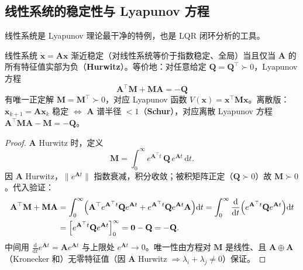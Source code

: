 \subsection{线性系统的稳定性与 Lyapunov 方程}
\label{sec:ctrl-lyap-linear}

线性系统是 Lyapunov 理论最干净的特例，也是 LQR 闭环分析的工具。

\begin{theorem}
\label{thm:ctrl-lyap-eq}
线性系统 $\dot{\mathbf{x}}=\mathbf{A}\mathbf{x}$ 渐近稳定（对线性系统等价于指数稳定、全局）当且仅当 $\mathbf{A}$ 的所有特征值实部为负（\textbf{Hurwitz}）。等价地：对任意给定 $\mathbf{Q}=\mathbf{Q}^\top\succ0$，Lyapunov 方程
\begin{equation}
  \boxed{\mathbf{A}^\top\mathbf{M}+\mathbf{M}\mathbf{A}=-\mathbf{Q}}
  \label{eq:ctrl-lyap-eq}
\end{equation}
有唯一正定解 $\mathbf{M}=\mathbf{M}^\top\succ0$，对应 Lyapunov 函数 $V(\mathbf{x})=\mathbf{x}^\top\mathbf{M}\mathbf{x}$。离散版：$\mathbf{x}_{k+1}=\mathbf{A}\mathbf{x}_k$ 稳定 $\iff$ $\mathbf{A}$ 谱半径 $<1$（\textbf{Schur}），对应离散 Lyapunov 方程 $\mathbf{A}^\top\mathbf{M}\mathbf{A}-\mathbf{M}=-\mathbf{Q}$。
\end{theorem}
\begin{proof}
$\mathbf{A}$ Hurwitz 时，定义
\begin{equation}
  \mathbf{M}=\int_0^\infty e^{\mathbf{A}^\top t}\,\mathbf{Q}\,e^{\mathbf{A}t}\,\mathrm dt.
  \label{eq:ctrl-lyap-int}
\end{equation}
因 $\mathbf{A}$ Hurwitz，$\|e^{\mathbf{A}t}\|$ 指数衰减，积分收敛；被积矩阵正定（$\mathbf{Q}\succ0$）故 $\mathbf{M}\succ0$。代入验证：
\begin{align}
  \mathbf{A}^\top\mathbf{M}+\mathbf{M}\mathbf{A}
  &=\int_0^\infty\!\Big(\mathbf{A}^\top e^{\mathbf{A}^\top t}\mathbf{Q}e^{\mathbf{A}t}+e^{\mathbf{A}^\top t}\mathbf{Q}e^{\mathbf{A}t}\mathbf{A}\Big)\mathrm dt
   =\int_0^\infty\frac{\mathrm d}{\mathrm dt}\Big(e^{\mathbf{A}^\top t}\mathbf{Q}e^{\mathbf{A}t}\Big)\mathrm dt\notag\\
  &=\Big[e^{\mathbf{A}^\top t}\mathbf{Q}e^{\mathbf{A}t}\Big]_0^\infty=\mathbf{0}-\mathbf{Q}=-\mathbf{Q}.
\end{align}
中间用 $\frac{\mathrm d}{\mathrm dt}e^{\mathbf{A}t}=\mathbf{A}e^{\mathbf{A}t}$ 与上限处 $e^{\mathbf{A}t}\to0$。唯一性由方程对 $\mathbf{M}$ 是线性、且 $\mathbf{A}\oplus\mathbf{A}$（Kronecker 和）无零特征值（因 $\mathbf{A}$ Hurwitz $\Rightarrow\lambda_i+\lambda_j\neq0$）保证。
\end{proof}

